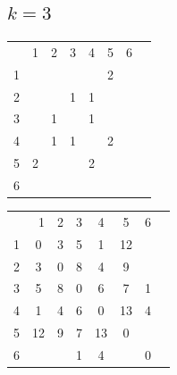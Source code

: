 \documentclass[10pt,a4paper,spanish]{report}
\theoremstyle{definition}
\theoremstyle{remark}
\begin{document}
\subsection{$k=3$}
\begin{minipage}{0.5\textwidth}
\begin{center}
\begin{tabular}{c|c|c|c|c|c|c|c|}
\multicolumn{2}{r}{1} & \multicolumn{1}{c}{2} & \multicolumn{1}{c}{3} & \multicolumn{1}{c}{4} & \multicolumn{1}{c}{5} & \multicolumn{1}{c}{6} \\ 
\cline{2-7}
1 & & & & & 2 & \cellcolor{Black}{\textcolor{White}{3}} \\
\cline{2-7} 
2 & & & 1 & 1 & &\cellcolor{Black}{\textcolor{White}{3}}\\
\cline{2-7} 
3 & & 1 & & 1 & & \\
\cline{2-7} 
4 & & 1 & 1 & & 2 & \\
\cline{2-7} 
5 & 2 & & & 2 & &\cellcolor{Black}{\textcolor{White}{3}}\\
\cline{2-7} 
6 &\cellcolor{Black}{\textcolor{White}{3}}&\cellcolor{Black}{\textcolor{White}{3}}& & &\cellcolor{Black}{\textcolor{White}{3}}& \\
\cline{2-7} 
\end{tabular}
\end{center}
\end{minipage}
\begin{minipage}{0.5\textwidth}
\begin{center}
\begin{tabular}{c|c|c|c|c|c|c|c|}
\multicolumn{2}{r}{1} & \multicolumn{1}{c}{2} & \multicolumn{1}{c}{3} & \multicolumn{1}{c}{4} & \multicolumn{1}{c}{5} & \multicolumn{1}{c}{6} \\ 
\cline{2-7}
1 & 0 & 3 & 5 & 1 & 12 & \cellcolor{Black}{\textcolor{White}{6}} \\
\cline{2-7} 
2 & 3 & 0 & 8 & 4 & 9 & \cellcolor{Black}{\textcolor{White}{9}} \\
\cline{2-7} 
3 & 5 & 8 & 0 & 6 & 7 & 1 \\
\cline{2-7} 
4 & 1 & 4 & 6 & 0 & 13 & 4 \\
\cline{2-7} 
5 & 12 & 9 & 7 & 13 & 0 &  \cellcolor{Black}{\textcolor{White}{8}} \\
\cline{2-7} 
6 & \cellcolor{Black}{\textcolor{White}{6}} & \cellcolor{Black}{\textcolor{White}{9}} & 1 & 4 & \cellcolor{Black}{\textcolor{White}{8}} & 0 \\
\cline{2-7} 
\end{tabular}
\end{center}
\end{minipage}
\end{document}
